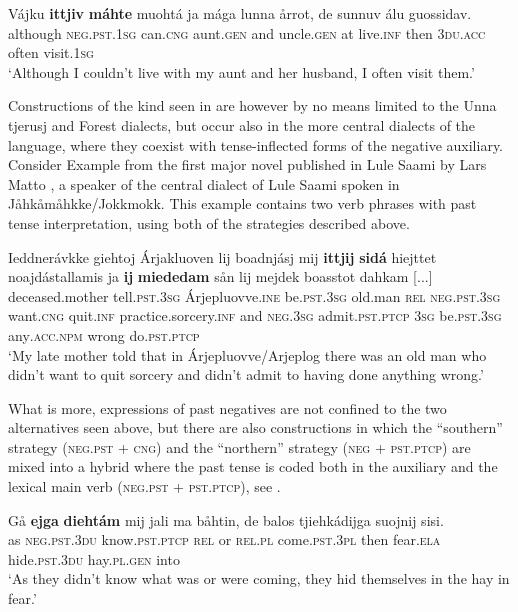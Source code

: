 \documentclass[output=paper,colorlinks,citecolor=brown]{langscibook}
\begin{document}
\ea\label{ex:lul:6} 
    \gll Vájku \textbf{ittjiv} \textbf{máhte} muohtá ja mága lunna årrot, de sunnuv álu guossidav. \\ 
         although \textsc{neg.pst.1sg} can.\textsc{cng} aunt.\textsc{gen} and uncle.\textsc{gen} at live.\textsc{inf} then \textsc{3du.acc} often visit.\textsc{1sg} \\
    \glt  ‘Although I couldn’t live with my aunt and her husband, I often visit them.’ \citep{SIKOR2021}
\z 

Constructions of the kind seen in  are however by no means limited to the Unna tjerusj and Forest dialects, but occur also in the more central dialects of the language, where they coexist with tense-inflected forms of the negative auxiliary. Consider Example  from the first major novel published in Lule Saami by Lars Matto \citet{Tuolja1987}, a speaker of the central dialect of Lule Saami spoken in Jåhkåmåhkke/Jokkmokk. This example contains two verb phrases with past tense interpretation, using both of the strategies described above.

\ea\label{ex:lul:7} 
    \gll Ieddnerávkke giehtoj Árjakluoven lij boadnjásj mij  \textbf{ittjij} \textbf{sidá} hiejttet noajdástallamis ja \textbf{ij} \textbf{miededam} sån lij mejdek boasstot dahkam [...] \\ 
         deceased.mother tell.\textsc{pst.3sg} Árjepluovve.\textsc{ine} be.\textsc{pst.3sg} old.man \textsc{rel} \textsc{neg.pst.3sg} want.\textsc{cng} quit.\textsc{inf} practice.sorcery.\textsc{inf} and \textsc{neg}.\textsc{3sg} admit.\textsc{pst.ptcp}  \textsc{3sg} be.\textsc{pst.3sg} any\textsc{.acc.npm} wrong do.\textsc{pst.ptcp}\\
    \glt ‘My late mother told that in Árjepluovve/Arjeplog there was an old man who didn’t want to quit sorcery and didn’t admit to having done anything wrong.’ \citep{SIKOR2021}
\z 

What is more, expressions of past negatives are not confined to the two alternatives seen above, but there are also constructions in which the “southern” strategy (\textsc{neg.pst} \textsc{+} \textsc{cng}) and the “northern” strategy (\textsc{neg} \textsc{+} \textsc{pst.ptcp}) are mixed into a hybrid where the past tense is coded both in the auxiliary and the lexical main verb (\textsc{neg.pst} \textsc{+} \textsc{pst.ptcp}), see .

\ea\label{ex:lul:8} 
    \gll Gå \textbf{ejga} \textbf{diehtám} mij jali ma båhtin, de balos tjiehkádijga suojnij sisi.\\ 
         as \textsc{neg.pst.3du} know.\textsc{pst.ptcp} \textsc{rel} or \textsc{rel.pl} come.\textsc{pst.3pl} then fear.\textsc{ela} hide.\textsc{pst.3du} hay.\textsc{pl}.\textsc{gen} into\\
    \glt ‘As they didn’t know what was or were coming, they hid themselves in the hay in fear.’ \citep{SIKOR2021}
\z 
\end{document}
